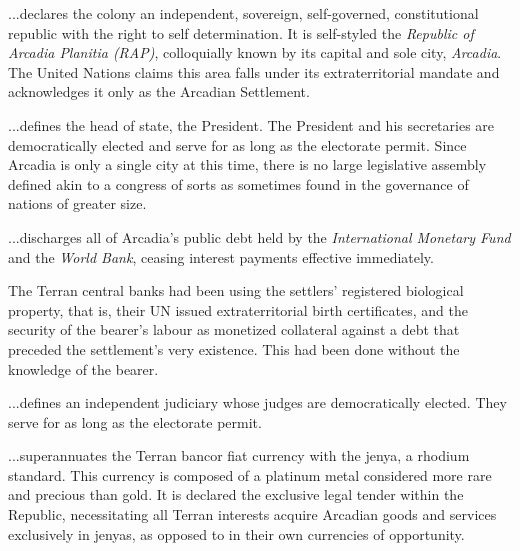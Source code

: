 
\startarticle
\item %

...declares the colony an independent, sovereign, self-governed, constitutional republic with the right to self determination. It is self-styled the {\it Republic of Arcadia Planitia (RAP)}, colloquially known by its capital and sole city, {\it Arcadia}. The United Nations claims this area falls under its extraterritorial mandate and acknowledges it only as the Arcadian Settlement.

\item %

...defines the head of state, the President. The President and his secretaries are democratically elected and serve for as long as the electorate permit. Since Arcadia is only a single city at this time, there is no large legislative assembly defined akin to a congress of sorts as sometimes found in the governance of nations of greater size.

\item %

...discharges all of Arcadia's public debt held by the {\it International Monetary Fund} and the {\it World Bank}, ceasing interest payments effective immediately. 

The Terran central banks had been using the settlers' registered biological property, that is, their UN issued extraterritorial birth certificates, and the security of the bearer's labour as monetized collateral against a debt that preceded the settlement's very existence. This had been done without the knowledge of the bearer.

\item %

...defines an independent judiciary whose judges are democratically elected. They serve for as long as the electorate permit.
\stoparticle

\startarticle[start=7]
\item %

...superannuates the Terran bancor fiat currency with the jenya, a rhodium standard. This currency is composed of a platinum metal considered more rare and precious than gold. It is declared the exclusive legal tender within the Republic, necessitating all Terran interests acquire Arcadian goods and services exclusively in jenyas, as opposed to in their own currencies of opportunity.

